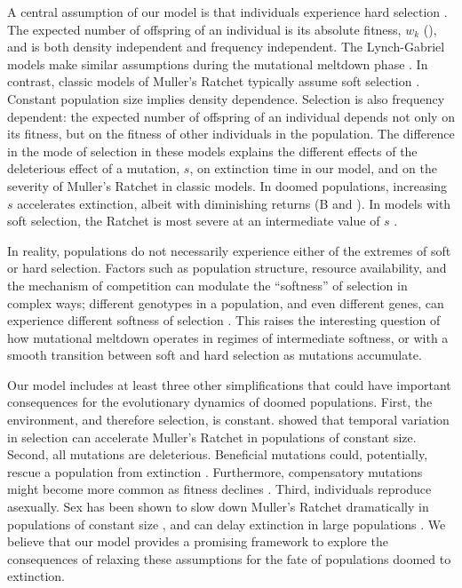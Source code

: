 \documentclass[9pt,lineno]{elife}
\begin{document}
A central assumption of our model  is that individuals experience hard selection \citep{wal75}.   
The expected number of offspring of an individual is its absolute fitness, $w_k$ (), and is both density independent and frequency independent.  The Lynch-Gabriel models make similar assumptions during the mutational meltdown phase \citep{lyn93,lyn95}. 
% 
In contrast, classic models of Muller's Ratchet typically assume soft selection \citep{wal75}.  Constant population size implies density dependence.  Selection is also frequency dependent: the expected number of offspring of an individual depends not only on its fitness, but on the fitness of other individuals in the population.
%
The difference in the mode of selection in these models explains the different effects of the deleterious effect of a mutation, $s$, on extinction time in our model, and on the severity of Muller's Ratchet in classic models.  In doomed populations, increasing $s$ accelerates extinction, albeit with diminishing returns (B and ).  In models with soft selection, the Ratchet is most severe at an intermediate value of $s$ 
\citep[C;][]{lyn95, Gordo_On_2000, gor00b}.  

In reality, populations do not necessarily experience either of the extremes of soft or hard selection.  Factors such as population structure, resource availability, and the mechanism of competition can modulate the ``softness'' of selection in complex ways; different genotypes in a population, and even different genes, can experience different softness of selection \citep{laf10, ho12}.  This raises the interesting question of how mutational meltdown operates in regimes of intermediate softness, or with a smooth transition between soft and hard selection as mutations accumulate.

Our model includes at least three other simplifications that could have important consequences for the evolutionary dynamics of doomed populations.  
%
First, the environment, and therefore selection, is constant.  \citet{Wardlaw_Temporal_2012} showed that temporal variation in selection can accelerate Muller's Ratchet in populations of constant size.
%
Second, all mutations are deleterious.  Beneficial mutations could, potentially, rescue a population from extinction \citep{mar13}.  Furthermore, compensatory mutations might become more common as fitness declines \citep{poo00, sil07}.
%
Third, individuals reproduce asexually.  Sex has been shown to slow down Muller's Ratchet dramatically in populations of constant size \citep{pam87, cha93}, and can delay extinction in large populations \citep{lyn95a}.
%
We believe that our model provides a promising framework to explore the consequences of relaxing these assumptions 
for the fate of populations doomed to extinction.
\end{document}
